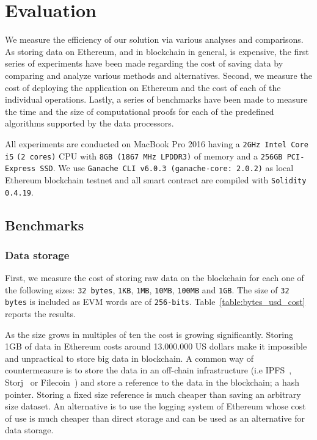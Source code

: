 \chapter{Evaluation}
\label{evaluation}

We measure the efficiency of our solution via various analyses and comparisons. As storing data on Ethereum, and in blockchain in general, is expensive, the first series of experiments have been made regarding the cost of saving data by comparing and analyze various methods and alternatives. Second, we measure the cost of deploying the application on Ethereum and the cost of each of the individual operations. Lastly, a series of benchmarks have been made to measure the time and the size of computational proofs for each of the predefined algorithms supported by the data processors.

All experiments are conducted on MacBook Pro 2016 having a \verb|2GHz Intel Core i5| \verb|(2 cores)| CPU with \verb|8GB (1867 MHz LPDDR3)| of memory and a \verb|256GB PCI-Express SSD|. We use \verb|Ganache CLI v6.0.3 (ganache-core: 2.0.2)| as local Ethereum blockchain testnet and all smart contract are compiled with \verb|Solidity 0.4.19|.

\section{Benchmarks}
\label{evaluation:benchmarks}

\subsection{Data storage}
\label{evaluation:data_storage}

First, we measure the cost of storing raw data on the blockchain for each one of the following sizes: \verb|32 bytes|, \verb|1KB|, \verb|1MB|, \verb|10MB|, \verb|100MB| and \verb|1GB|. The size of \verb|32 bytes| is included as EVM words are of \verb|256-bits|. Table~\ref{table:bytes_usd_cost} reports the results.

As the size grows in multiples of ten the cost is growing significantly. Storing 1GB of data in Ethereum costs around 13.000.000 US dollars make it impossible and unpractical to store big data in blockchain. A common way of countermeasure is to store the data in an off-chain infrastructure (i.e IPFS~\cite{ipfs}, Storj~\cite{storj} or Filecoin~\cite{filecoin}) and store a reference to the data in the blockchain; a hash pointer. Storing a fixed size reference is much cheaper than saving an arbitrary size dataset. An alternative is to use the logging system of Ethereum whose cost of use is much cheaper than direct storage and can be used as an alternative for data storage.

